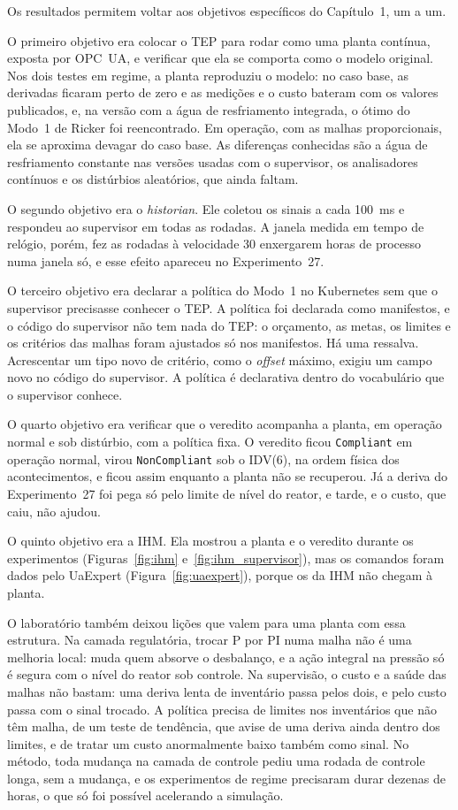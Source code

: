 Os resultados permitem voltar aos objetivos específicos do Capítulo~1, um a um.

O primeiro objetivo era colocar o TEP para rodar como uma planta contínua, exposta por OPC~UA, e verificar que ela se comporta como o modelo original. Nos dois testes em regime, a planta reproduziu o modelo: no caso base, as derivadas ficaram perto de zero e as medições e o custo bateram com os valores publicados, e, na versão com a água de resfriamento integrada, o ótimo do Modo~1 de Ricker foi reencontrado. Em operação, com as malhas proporcionais, ela se aproxima devagar do caso base. As diferenças conhecidas são a água de resfriamento constante nas versões usadas com o supervisor, os analisadores contínuos e os distúrbios aleatórios, que ainda faltam.

O segundo objetivo era o \textit{historian}. Ele coletou os sinais a cada 100~ms e respondeu ao supervisor em todas as rodadas. A janela medida em tempo de relógio, porém, fez as rodadas à velocidade 30 enxergarem horas de processo numa janela só, e esse efeito apareceu no Experimento~27.

O terceiro objetivo era declarar a política do Modo~1 no Kubernetes sem que o supervisor precisasse conhecer o TEP. A política foi declarada como manifestos, e o código do supervisor não tem nada do TEP: o orçamento, as metas, os limites e os critérios das malhas foram ajustados só nos manifestos. Há uma ressalva. Acrescentar um tipo novo de critério, como o \textit{offset} máximo, exigiu um campo novo no código do supervisor. A política é declarativa dentro do vocabulário que o supervisor conhece.

O quarto objetivo era verificar que o veredito acompanha a planta, em operação normal e sob distúrbio, com a política fixa. O veredito ficou \texttt{Compliant} em operação normal, virou \texttt{NonCompliant} sob o IDV(6), na ordem física dos acontecimentos, e ficou assim enquanto a planta não se recuperou. Já a deriva do Experimento~27 foi pega só pelo limite de nível do reator, e tarde, e o custo, que caiu, não ajudou.

O quinto objetivo era a IHM. Ela mostrou a planta e o veredito durante os experimentos (Figuras~\ref{fig:ihm} e~\ref{fig:ihm_supervisor}), mas os comandos foram dados pelo UaExpert (Figura~\ref{fig:uaexpert}), porque os da IHM não chegam à planta.

O laboratório também deixou lições que valem para uma planta com essa estrutura. Na camada regulatória, trocar P por PI numa malha não é uma melhoria local: muda quem absorve o desbalanço, e a ação integral na pressão só é segura com o nível do reator sob controle. Na supervisão, o custo e a saúde das malhas não bastam: uma deriva lenta de inventário passa pelos dois, e pelo custo passa com o sinal trocado. A política precisa de limites nos inventários que não têm malha, de um teste de tendência, que avise de uma deriva ainda dentro dos limites, e de tratar um custo anormalmente baixo também como sinal. No método, toda mudança na camada de controle pediu uma rodada de controle longa, sem a mudança, e os experimentos de regime precisaram durar dezenas de horas, o que só foi possível acelerando a simulação.
